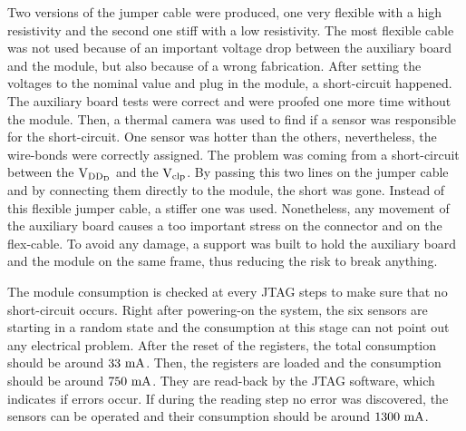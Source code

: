   Two versions of the jumper cable were produced, one very flexible with a high resistivity and the second one stiff with a low resistivity.
  The most flexible cable was not used because of an important voltage drop between the auxiliary board and the module, but also because of a wrong fabrication.
  After setting the voltages to the nominal value and plug in the module, a short-circuit happened.
  The auxiliary board tests were correct and were proofed one more time without the module.
  Then, a thermal camera was used to find if a sensor was responsible for the short-circuit.
  One sensor was hotter than the others, nevertheless, the wire-bonds were correctly assigned.
  The problem was coming from a short-circuit between the $\rm{V}_{\rm{DD_D}}$ and the $\rm{V}_{\rm{clp}}$.
  By passing this two lines on the jumper cable and by connecting them directly to the module, the short was gone.
  Instead of this flexible jumper cable, a stiffer one was used.
  Nonetheless, any movement of the auxiliary board causes a too important stress on the connector and on the flex-cable.
  To avoid any damage, a support was built to hold the auxiliary board and the module on the same frame, thus reducing the risk to break anything.

  The module consumption is checked at every \gls{JTAG} steps to make sure that no short-circuit occurs.
  Right after powering-on the system, the six sensors are starting in a random state and the consumption at this stage can not point out any electrical problem.
  After the reset of the registers, the total consumption should be around $33~\rm{mA}$.
  Then, the registers are loaded and the consumption should be around $750~\rm{mA}$.
  They are read-back by the \gls{JTAG} software, which indicates if errors occur.
  If during the reading step no error was discovered, the sensors can be operated and their consumption should be around $1300~\rm{mA}$.



